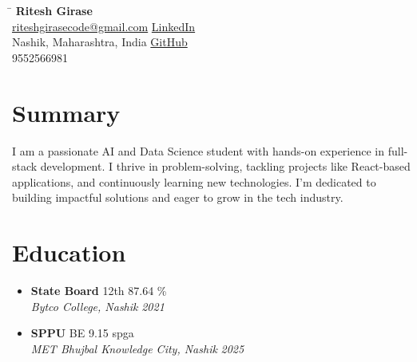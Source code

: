 \documentclass[a4paper,10pt]{article}
\newcommand{\resumeSubheading}[4]{
      \item
        \textbf{#1} \hfill #2 \\
        \textit{#3} \hfill \textit{#4}
    }
\begin{document}
  
    \begin{tabbing}
    \hspace{4in} \= \kill
    {\Huge \textbf{Ritesh Girase}} \\
    \href{mailto:riteshgirasecode@gmail.com}{riteshgirasecode@gmail.com} \> 
    \hspace{1.8in}
    \href{https://www.linkedin.com/}{LinkedIn} \\
    Nashik, Maharashtra, India \> \hspace{1.85in}\href{https://github.com}{GitHub} \\ 
    9552566981 \\
    \end{tabbing}
    \vspace{-0.4cm}
  
    \section*{Summary}
    \noindent
    I am a passionate AI and Data Science student with hands-on experience in full-stack development. I thrive in problem-solving, tackling projects like React-based applications, and continuously learning new technologies. I'm dedicated to building impactful solutions and eager to grow in the tech industry.
    \vspace{-0.5em}
  
    \section*{\textbf{Education}}
    \begin{itemize}[leftmargin=0.15in, label={}]
        
        \resumeSubheading
            {State Board}{12th 87.64 \%}
            {Bytco College, Nashik}{2021}
        \vspace{-0.1em}
        \resumeSubheading
            {SPPU}{BE 9.15 spga}
            {MET Bhujbal Knowledge City, Nashik}{2025}
        \vspace{-0.1em}
    \end{itemize}
    \vspace{-0.5em}
  
\end{document}
